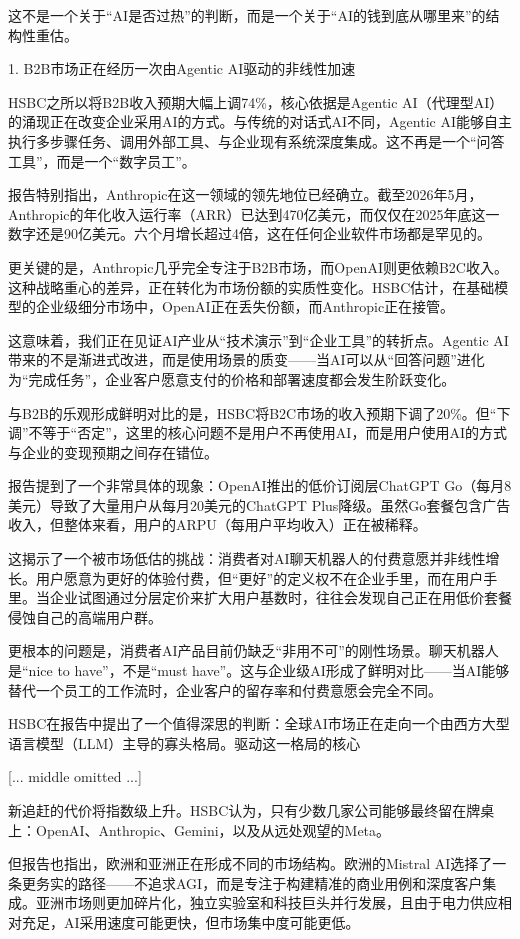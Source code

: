 \documentclass[11pt]{ctexart}
\begin{document}
这不是一个关于“AI是否过热”的判断，而是一个关于“AI的钱到底从哪里来”的结构性重估。

1. B2B市场正在经历一次由Agentic AI驱动的非线性加速

HSBC之所以将B2B收入预期大幅上调74\%，核心依据是Agentic AI（代理型AI）的涌现正在改变企业采用AI的方式。与传统的对话式AI不同，Agentic AI能够自主执行多步骤任务、调用外部工具、与企业现有系统深度集成。这不再是一个“问答工具”，而是一个“数字员工”。

报告特别指出，Anthropic在这一领域的领先地位已经确立。截至2026年5月，Anthropic的年化收入运行率（ARR）已达到470亿美元，而仅仅在2025年底这一数字还是90亿美元。六个月增长超过4倍，这在任何企业软件市场都是罕见的。

更关键的是，Anthropic几乎完全专注于B2B市场，而OpenAI则更依赖B2C收入。这种战略重心的差异，正在转化为市场份额的实质性变化。HSBC估计，在基础模型的企业级细分市场中，OpenAI正在丢失份额，而Anthropic正在接管。

这意味着，我们正在见证AI产业从“技术演示”到“企业工具”的转折点。Agentic AI带来的不是渐进式改进，而是使用场景的质变——当AI可以从“回答问题”进化为“完成任务”，企业客户愿意支付的价格和部署速度都会发生阶跃变化。

与B2B的乐观形成鲜明对比的是，HSBC将B2C市场的收入预期下调了20\%。但“下调”不等于“否定”，这里的核心问题不是用户不再使用AI，而是用户使用AI的方式与企业的变现预期之间存在错位。

报告提到了一个非常具体的现象：OpenAI推出的低价订阅层ChatGPT Go（每月8美元）导致了大量用户从每月20美元的ChatGPT Plus降级。虽然Go套餐包含广告收入，但整体来看，用户的ARPU（每用户平均收入）正在被稀释。

这揭示了一个被市场低估的挑战：消费者对AI聊天机器人的付费意愿并非线性增长。用户愿意为更好的体验付费，但“更好”的定义权不在企业手里，而在用户手里。当企业试图通过分层定价来扩大用户基数时，往往会发现自己正在用低价套餐侵蚀自己的高端用户群。

更根本的问题是，消费者AI产品目前仍缺乏“非用不可”的刚性场景。聊天机器人是“nice to have”，不是“must have”。这与企业级AI形成了鲜明对比——当AI能够替代一个员工的工作流时，企业客户的留存率和付费意愿会完全不同。

HSBC在报告中提出了一个值得深思的判断：全球AI市场正在走向一个由西方大型语言模型（LLM）主导的寡头格局。驱动这一格局的核心

[... middle omitted ...]

新追赶的代价将指数级上升。HSBC认为，只有少数几家公司能够最终留在牌桌上：OpenAI、Anthropic、Gemini，以及从远处观望的Meta。

但报告也指出，欧洲和亚洲正在形成不同的市场结构。欧洲的Mistral AI选择了一条更务实的路径——不追求AGI，而是专注于构建精准的商业用例和深度客户集成。亚洲市场则更加碎片化，独立实验室和科技巨头并行发展，且由于电力供应相对充足，AI采用速度可能更快，但市场集中度可能更低。
\end{document}
